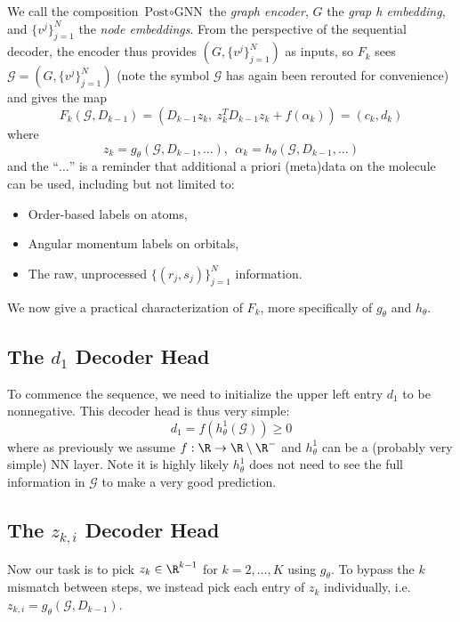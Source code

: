 \documentclass[12pt]{article}
\begin{document}
    We call the composition $\text{Post} \circ \text{GNN}$ the \textit{graph encoder}, $G$ the \textit{grap h embedding}, and $\{v^j\}_{j=1}^N$ the \textit{node embeddings}. From the perspective of the sequential decoder, the encoder thus provides $(G, \{v^j\}_{j=1}^N)$ as inputs, so $F_k$ sees $\mathcal{G} = (G, \{v^j\}_{j=1}^N)$ (note the symbol $\mathcal{G}$ has again been rerouted for convenience) and gives the map
    \[ F_k(\mathcal{G}, D_{k-1}) = (D_{k-1} z_k,\  z_k^T D_{k-1} z_k + f(\alpha_k)) = (c_k, d_k)\]
    where
    \[ z_k = g_{\theta}(\mathcal{G}, D_{k-1}, \ldots), \ \ \alpha_k = h_\theta (\mathcal{G}, D_{k-1}, \ldots)\]
    and the ``$\ldots$'' is a reminder that additional a priori (meta)data on the molecule can be used, including but not limited to:
    \begin{itemize}
        \item Order-based labels on atoms,
        \item Angular momentum labels on orbitals,
        \item The raw, unprocessed $\{(r_j, s_j)\}_{j=1}^N$ information.
    \end{itemize}

    We now give a practical characterization of $F_k$, more specifically of $g_\theta$ and $h_\theta$. 

    \subsection{The $d_1$ Decoder Head}
    To commence the sequence, we need to initialize the upper left entry $d_1$ to be nonnegative. This decoder head is thus very simple:
    \begin{equation}
        d_1 = f(h^1_\theta(\mathcal{G})) \geq 0
    \end{equation}
    where as previously we assume $f: \R \to \R \setminus \R^-$ and $h_\theta^1$ can be a (probably very simple) NN layer. Note it is highly likely $h_\theta^1$ does not need to see the full information in $\mathcal{G}$ to make a very good prediction.     

    \subsection{The $z_{k, i}$ Decoder Head}
    Now our task is to pick $z_k \in \R^{k-1}$ for $k = 2, \ldots, K$ using $g_\theta$. To bypass the $k$ mismatch between steps, we instead pick each entry of $z_k$ individually, i.e. $z_{k, i} = g_\theta(\mathcal{G}, D_{k-1})$. \\[-6pt]
    
\end{document}
